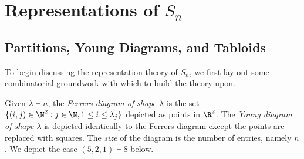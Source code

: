 \documentclass[../main.tex]{subfiles}
\begin{document}
\section{Representations of $ S_{n} $}
\subsection{Partitions, Young Diagrams, and Tabloids}
To begin discussing the representation theory of $ S_{n} $, we first lay out some combinatorial groundwork with which to build the theory upon.
\begin{definition}\label{def:youngdiagram}
  Given $ \lambda\vdash n $, the \textit{Ferrers diagram of shape $ \lambda $} is the set $\{(i,j)\in \N^{2} : j\in \N, 1\leq i \leq \lambda_{j}\}$ depicted as points in $ \R^{2} $. The \textit{Young diagram of shape $ \lambda $} is depicted identically to the Ferrers diagram except the points are replaced with squares. The \textit{size} of the diagram is the number of entries, namely $ n $. We depict the case $ (5,2,1)\vdash 8 $ below.
\end{definition}
\end{document}
